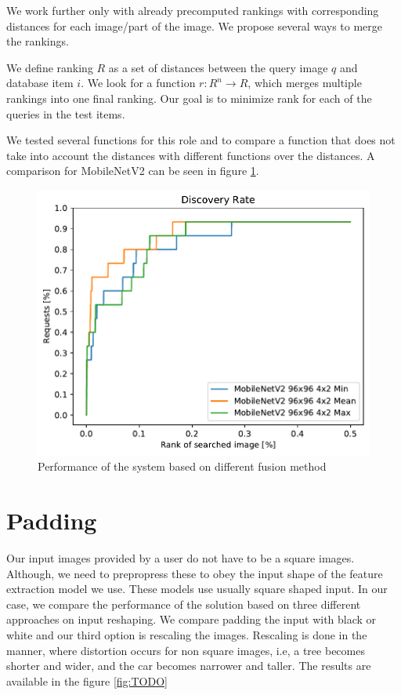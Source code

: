 We work further only with already precomputed rankings with corresponding distances for each image/part of the image. We propose several ways to merge the rankings.

We define ranking $R$ as a set of distances between the query image $q$ and database item $i$. We look for a function $r: R^n \rightarrow R$, which merges multiple rankings into one final ranking. Our goal is to minimize rank for each of the queries in the test items.

We tested several functions for this role and to compare a function that does not take into account the distances with different functions over the distances. A comparison for MobileNetV2 can be seen in figure \ref{fig:ranking_funcs}.

\begin{figure}
\centering
\includegraphics[width=\textwidth]{graphs/362cb9a687ce05c7732f973defca88fb8c5c393f5992066521343314698c9de7}
\caption{Performance of the system based on different fusion method}
\label{fig:ranking_funcs}
\end{figure}

\section{Padding}

Our input images provided by a user do not have to be a square images. Although, we need to prepropress these to obey the input shape of the feature extraction model we use. These models use usually square shaped input. In our case, we compare the performance of the solution based on three different approaches on input reshaping. We compare padding the input with black or white and our third option is rescaling the images. Rescaling is done in the manner, where distortion occurs for non square images, i.e, a tree becomes shorter and wider, and the car becomes narrower and taller. The results are available in the figure \ref{fig:TODO}

